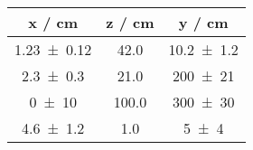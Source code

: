 \documentclass{scrartcl}
\begin{document}
\begin{tabular}{ccc}\toprule
x / cm & z / cm & y / cm\\ 
\midrule
\num{1.23 +- 0.12} & 42.0 & \num{10.2 +- 1.2}\\
\num{2.3 +- 0.3} & 21.0 & \num{200 +- 21}\\
\num{0 +- 10} & 100.0 & \num{300 +- 30}\\
\num{4.6 +- 1.2} & 1.0 & \num{5 +- 4}\\
\bottomrule
\end{tabular}
\end{document}
